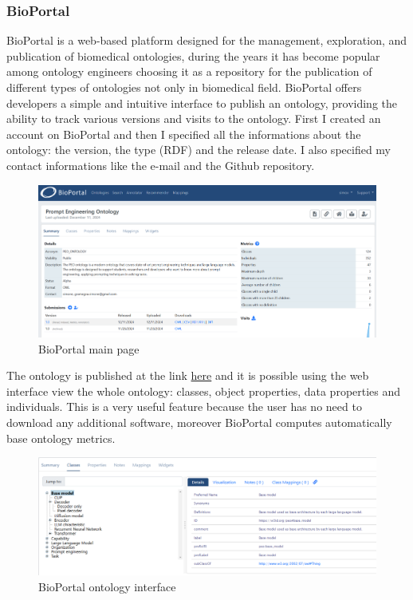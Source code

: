 \subsubsection{BioPortal}
BioPortal is a  web-based platform designed for the management, exploration, and publication of biomedical ontologies, during the years it has become popular among ontology engineers choosing it as a repository for the publication of different types of ontologies not only in biomedical field. BioPortal offers developers a simple and intuitive interface to publish an ontology, providing the ability to track various versions and visits to the ontology. First I created an account on BioPortal and then I specified all the informations about the ontology: the version, the type (RDF) and the release date. I also specified my contact informations like the e-mail and the Github repository.
\begin{figure}[H]
    \centering
    \includegraphics[width=0.9\linewidth]{Figures/fig_67.png}
    \caption{BioPortal main page}
    \label{fig:enter-label}
\end{figure}
The ontology is published at the link \href{https://bioportal.bioontology.org/ontologies/PEO_ONTOLOGY?p=summary}{here} and it is possible using the web interface view the whole ontology: classes, object properties, data properties and individuals. This is a very useful feature because the user has no need to download any additional software, moreover BioPortal computes automatically base ontology metrics. 
\begin{figure}[H]
    \centering
    \includegraphics[width=0.9\linewidth]{Figures/fig_68.png}
    \caption{BioPortal ontology interface}
    \label{fig:enter-label}
\end{figure}


